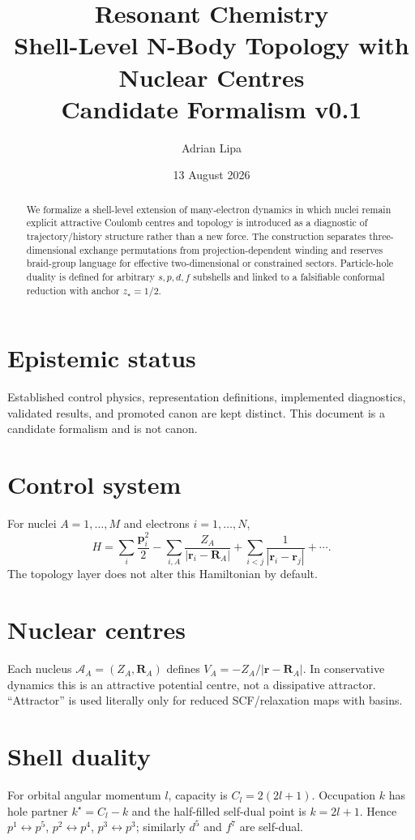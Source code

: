 \documentclass[11pt,a4paper]{article}
\title{Resonant Chemistry\\Shell-Level N-Body Topology with Nuclear Centres\\Candidate Formalism v0.1}
\author{Adrian Lipa}
\date{13 August 2026}
\begin{document}
\maketitle
\begin{abstract}
We formalize a shell-level extension of many-electron dynamics in which nuclei remain explicit attractive Coulomb centres and topology is introduced as a diagnostic of trajectory/history structure rather than a new force. The construction separates three-dimensional exchange permutations from projection-dependent winding and reserves braid-group language for effective two-dimensional or constrained sectors. Particle-hole duality is defined for arbitrary $s,p,d,f$ subshells and linked to a falsifiable conformal reduction with anchor $z_\star=1/2$.
\end{abstract}
\section{Epistemic status}
Established control physics, representation definitions, implemented diagnostics, validated results, and promoted canon are kept distinct. This document is a candidate formalism and is not canon.
\section{Control system}
For nuclei $A=1,\dots,M$ and electrons $i=1,\dots,N$,
\begin{equation}
H=\sum_i\frac{\mathbf p_i^2}{2}-\sum_{i,A}\frac{Z_A}{|\mathbf r_i-\mathbf R_A|}+\sum_{i<j}\frac{1}{|\mathbf r_i-\mathbf r_j|}+\cdots.
\end{equation}
The topology layer does not alter this Hamiltonian by default.
\section{Nuclear centres}
Each nucleus $\mathcal A_A=(Z_A,\mathbf R_A)$ defines $V_A=-Z_A/|\mathbf r-\mathbf R_A|$. In conservative dynamics this is an attractive potential centre, not a dissipative attractor. ``Attractor'' is used literally only for reduced SCF/relaxation maps with basins.
\section{Shell duality}
For orbital angular momentum $l$, capacity is $C_l=2(2l+1)$. Occupation $k$ has hole partner $k^\star=C_l-k$ and the half-filled self-dual point is $k=2l+1$. Hence $p^1\leftrightarrow p^5$, $p^2\leftrightarrow p^4$, $p^3\leftrightarrow p^3$; similarly $d^5$ and $f^7$ are self-dual.
\end{document}
